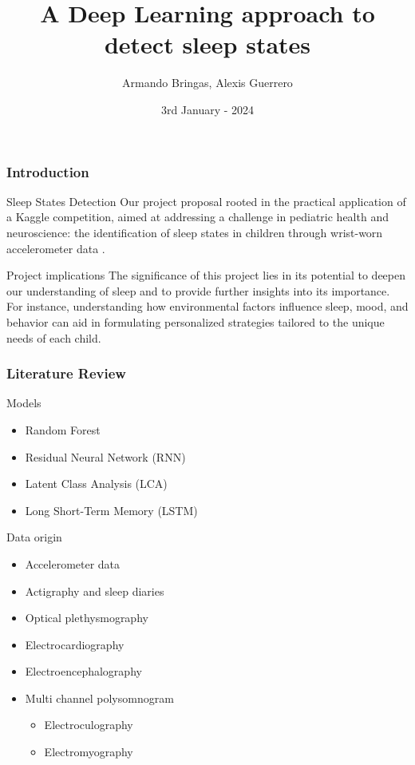 \documentclass[10pt]{beamer}
\title{\Huge{A Deep Learning approach to detect sleep states}}
\author{Armando Bringas, Alexis Guerrero}
\date{3rd January - 2024}
\begin{document}
\begin{frame}
  \titlepage
\end{frame}

\begin{frame}
  \frametitle{Introduction}
  \begin{block}{Sleep States Detection}
    Our project proposal rooted in the practical application of a Kaggle competition,
aimed at addressing a challenge in pediatric health and neuroscience: the identification of sleep states
in children through wrist-worn accelerometer data \cite{child-mind-institute-detect-sleep-states}.
  \end{block}
  \begin{block}{Project implications}
    The significance of this project lies in its potential to deepen our understanding of sleep and to provide
further insights into its importance. For instance, understanding how environmental factors influence
sleep, mood, and behavior can aid in formulating personalized strategies tailored to the unique needs
of each child.
  \end{block} 
\end{frame}

\begin{frame}
  \frametitle{Literature Review}
  \begin{block}{Models}
    \begin{itemize}
    \item Random Forest
    \item Residual Neural Network (RNN)
    \item Latent Class Analysis (LCA)
    \item Long Short-Term Memory (LSTM)
    \end{itemize}
  \end{block}
  \begin{block}{Data origin}
    \begin{itemize}
    \item Accelerometer data
    \item Actigraphy and sleep diaries
    \item Optical plethysmography
    \item Electrocardiography
    \item Electroencephalography
    \item Multi channel polysomnogram
      \begin{itemize}
      \item Electroculography
      \item Electromyography
      \end{itemize}
    \end{itemize}
  \end{block} 
\end{frame}
\end{document}
